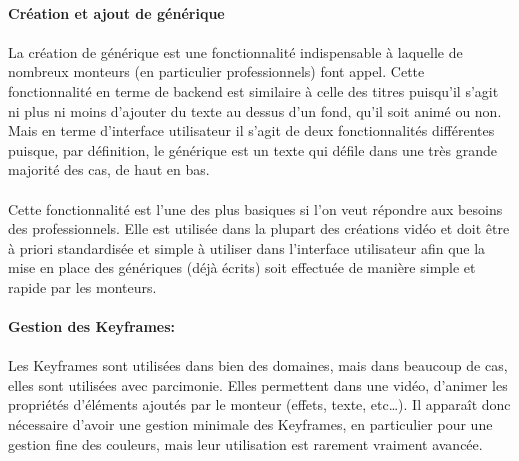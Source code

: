 \paragraph{Création et ajout de générique}

\paragraph{}

La création de générique est une fonctionnalité indispensable
à laquelle de nombreux monteurs (en particulier professionnels)
font appel. Cette fonctionnalité en terme de backend est similaire à
celle des titres puisqu'il s'agit ni plus ni moins d'ajouter du texte
au dessus d'un fond, qu'il soit animé ou non. Mais en terme d'interface
utilisateur  il s'agit
de deux fonctionnalités différentes puisque, par définition, le
générique est un texte qui défile dans une très grande majorité
des cas, de haut en bas.

\paragraph{}

Cette fonctionnalité est l'une des plus basiques si l'on veut
répondre aux besoins des professionnels. Elle est utilisée dans la
plupart des créations vidéo et doit être à priori standardisée et
simple à utiliser dans l'interface utilisateur afin que la mise en place
des génériques (déjà écrits) soit effectuée de manière simple et
rapide par les monteurs.

\paragraph{Gestion des Keyframes:}

\paragraph{}

Les Keyframes sont utilisées dans bien des domaines, mais dans beaucoup
de cas, elles sont utilisées avec parcimonie. Elles permettent dans une
vidéo, d'animer les propriétés d'éléments ajoutés par le monteur
(effets, texte, etc\ldots). Il apparaît donc nécessaire d'avoir une
gestion minimale des Keyframes, en particulier pour une gestion fine
des couleurs, mais leur utilisation est rarement vraiment avancée.

